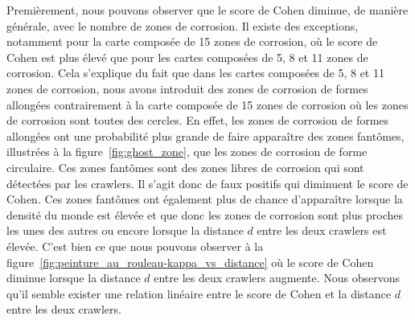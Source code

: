 \documentclass[francais,RandD]{rapportPFE}
\begin{document}
			Premièrement, nous pouvons observer que le score de Cohen diminue, de manière générale, avec le nombre de zones de corrosion.
			Il existe des exceptions, notamment pour la carte composée de 15 zones de corrosion, où le score de Cohen est plus élevé que pour les cartes composées de 5, 8 et 11 zones de corrosion.
			Cela s'explique du fait que dans les cartes composées de 5, 8 et 11 zones de corrosion, nous avons introduit des zones de corrosion de formes allongées contrairement à la carte composée de 15 zones de corrosion où les zones de corrosion sont toutes des cercles.
			En effet, les zones de corrosion de formes allongées ont une probabilité plus grande de faire apparaître des zones fantômes, illustrées à la figure~\ref{fig:ghost_zone}, que les zones de corrosion de forme circulaire.
			Ces zones fantômes sont des zones libres de corrosion qui sont détectées par les crawlers.
			Il s'agit donc de faux positifs qui diminuent le score de Cohen.
			Ces zones fantômes ont également plus de chance d'apparaître lorsque la densité du monde est élevée et que donc les zones de corrosion sont plus proches les unes des autres ou encore lorsque la distance $d$ entre les deux crawlers est élevée.
			C'est bien ce que nous pouvons observer à la figure~\ref{fig:peinture_au_rouleau-kappa_vs_distance} où le score de Cohen diminue lorsque la distance $d$ entre les deux crawlers augmente.
			Nous observons qu'il semble exister une relation linéaire entre le score de Cohen et la distance $d$ entre les deux crawlers.
\end{document}
